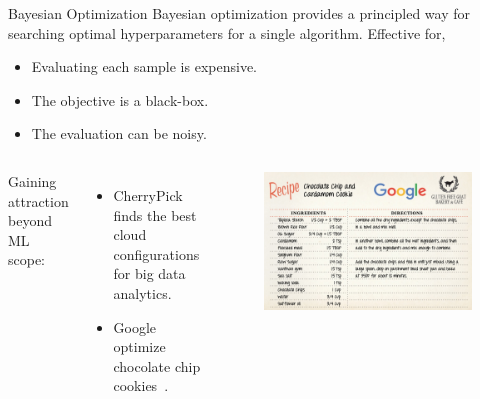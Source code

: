 \begin{frame}{Bayesian Optimization}
  Bayesian optimization provides a principled way for searching optimal
  hyperparameters for a single algorithm. Effective for,

  \begin{itemize}
    \item Evaluating each sample is expensive.
    \item The objective is a black-box.
    \item The evaluation can be noisy.
  \end{itemize}
  \pause
  \begin{columns}
    \footnotesize
    Gaining attraction beyond ML scope:

    \begin{itemize}
    \item CherryPick~\cite{alipourfard2017cherrypick} finds the best cloud
      configurations for big data analytics.
    \item Google optimize chocolate chip cookies~\cite{solnik2017bayesian}.
    \end{itemize}

    \pause
    \begin{figure}
      \includegraphics[width=\linewidth]{figures/google-cookie.jpg}
    \end{figure}
  \end{columns}
\end{frame}

